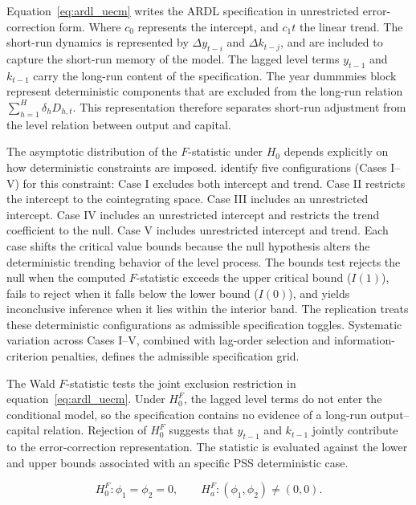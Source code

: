 \documentclass[11pt]{article}
\begin{document}
Equation~\eqref{eq:ardl_uecm} writes the ARDL specification in unrestricted error-correction form. Where $c_0$ represents the intercept, and $c_1t$ the linear trend. The short-run dynamics is represented by $\Delta y_{t-i}$ and $\Delta k_{t-j}$, and are included to capture the short-run memory of the model. The lagged level terms $y_{t-1}$ and $k_{t-1}$ carry the long-run content of the specification. The year dummmies block represent deterministic components that are excluded from the long-run relation $\sum_{h=1}^{H}\delta_h D_{h,t}$. This representation therefore separates short-run adjustment from the level relation between output and capital.

The asymptotic distribution of the $F$-statistic under $H_0$ depends explicitly on how deterministic constraints are imposed. \citet{Pesaran2001} identify five configurations (Cases I--V) for this constraint: Case I excludes both intercept and trend. Case II restricts the intercept to the cointegrating space. Case III includes an unrestricted intercept. Case IV includes an unrestricted intercept and restricts the trend coefficient to the null. Case V includes unrestricted intercept and trend. Each case shifts the critical value bounds because the null hypothesis alters the deterministic trending behavior of the level process. The bounds test rejects the null when the computed $F$-statistic exceeds the upper critical bound ($I(1)$), fails to reject when it falls below the lower bound ($I(0)$), and yields inconclusive inference when it lies within the interior band. The replication treats these deterministic configurations as admissible specification toggles. Systematic variation across Cases I--V, combined with lag-order selection and information-criterion penalties, defines the admissible specification grid.

The Wald $F$-statistic tests the joint exclusion restriction in equation~\eqref{eq:ardl_uecm}. Under $H_{0}^{F}$, the lagged level terms do not enter the conditional model, so the specification contains no evidence of a long-run output--capital relation. Rejection of $H_{0}^{F}$ suggests that $y_{t-1}$ and $k_{t-1}$ jointly contribute to the error-correction representation. The statistic is evaluated against the lower and upper bounds associated with an specific PSS deterministic case.

\begin{equation}
H_{0}^{F}: \phi_1=\phi_2=0,
\qquad
H_{a}^{F}: (\phi_1,\phi_2)\neq(0,0).
\label{eq:fbounds_hypothesis}
\end{equation}
\end{document}
